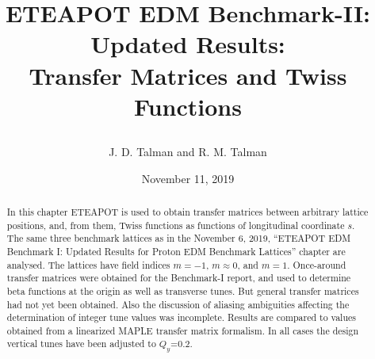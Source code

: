 \documentclass[]{article}
\begin{document}
\date{November 11, 2019}

\title{
\centerline{}
\centerline{}
\centerline{}
ETEAPOT EDM Benchmark-II: Updated Results: \\
Transfer Matrices and Twiss Functions 
}
\author{J. D. Talman and R. M. Talman
}

\maketitle


\begin{abstract}
In this chapter
ETEAPOT is used to obtain transfer matrices between arbitrary lattice positions,
and, from them, Twiss functions as functions of longitudinal coordinate $s$.
The same three benchmark lattices as in the November 6, 2019,
``ETEAPOT EDM Benchmark I: Updated Results for Proton EDM Benchmark Lattices'' 
chapter are 
analysed. The lattices have field indices $m=-1$, $m\approx0$, and $m=1$. 
Once-around transfer matrices were obtained for the Benchmark-I report, and used 
to determine beta functions at the origin as well as transverse tunes. But general 
transfer matrices had not yet been obtained. Also the discussion of aliasing 
ambiguities affecting the determination of integer tune values was incomplete.
Results are compared to values obtained from a linearized MAPLE transfer matrix 
formalism. In all cases the design vertical tunes have been adjusted to $Q_y$=0.2.
\end{abstract}
%
\end{document}
